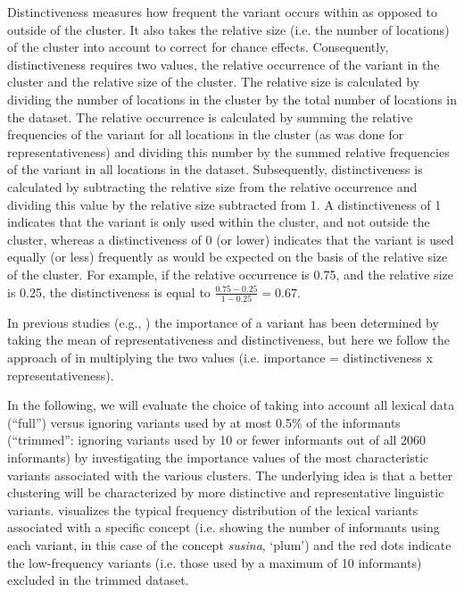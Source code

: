 \documentclass[output=paper]{LSP/langsci}
\begin{document}
Distinctiveness measures how frequent the variant occurs within as opposed to outside of the cluster. It also takes the relative size (i.e. the number of locations) of the cluster into account to correct for chance effects. Consequently, distinctiveness requires two values, the relative occurrence of the variant in the cluster and the relative size of the cluster. The relative size is calculated by dividing the number of locations in the cluster by the total number of locations in the dataset. The relative occurrence is calculated by summing the relative frequencies of the variant for all locations in the cluster (as was done for representativeness) and dividing this number by the summed relative frequencies of the variant in all locations in the dataset. Subsequently, distinctiveness is calculated by subtracting the relative size from the relative occurrence and dividing this value by the relative size subtracted from 1. A distinctiveness of 1 indicates that the variant is only used within the cluster, and not outside the cluster, whereas a distinctiveness of 0 (or lower) indicates that the variant is used equally (or less) frequently as would be expected on the basis of the relative size of the cluster. For example, if the relative occurrence is 0.75, and the relative size is 0.25, the distinctiveness is equal to $\frac{0.75 - 0.25}{1 - 0.25} = 0.67$.

In previous studies (e.g., \citealt{wieling_analyzing_2014}) the importance of a variant has been determined by taking the mean of representativeness and distinctiveness, but here we follow the approach of \citet{montemagni_tracking_2015} in multiplying the two values (i.e. importance = distinctiveness x representativeness).

In the following, we will evaluate the choice of taking into account all lexical data (``full'') versus ignoring variants used by at most 0.5\% of the informants (``trimmed'': ignoring variants used by 10 or fewer informants out of all 2060 informants) by investigating the importance values of the most characteristic variants associated with the various clusters. The underlying idea is that a better clustering will be characterized by more distinctive and representative linguistic variants.  visualizes the typical frequency distribution of the lexical variants associated with a specific concept (i.e. showing the number of informants using each variant, in this case of the concept \textit{susina}, `plum') and the red dots indicate the low-frequency variants (i.e. those used by a maximum of 10 informants) excluded in the trimmed dataset.
\end{document}
